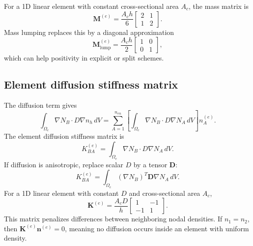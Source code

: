 \documentclass[11pt]{article}
\begin{document}
For a 1D linear element with constant cross-sectional area $A_c$, the mass matrix is
\begin{equation}
\bm{M}^{(e)}=\frac{A_c h}{6}
\begin{bmatrix}
2&1\\
1&2
\end{bmatrix}.
\label{eq:fem_1d_mass}
\end{equation}
Mass lumping replaces this by a diagonal approximation
\begin{equation}
\bm{M}^{(e)}_{\mathrm{lump}}=\frac{A_c h}{2}
\begin{bmatrix}
1&0\\
0&1
\end{bmatrix},
\end{equation}
which can help positivity in explicit or split schemes.

\subsection{Element diffusion stiffness matrix}
The diffusion term gives
\begin{equation}
\int_{\Omega_e}\nabla N_B\cdot D\nabla n_h\,dV
=\sum_{A=1}^{n_{en}}\left[\int_{\Omega_e}\nabla N_B\cdot D\nabla N_A\,dV\right]n_A^{(e)}.
\end{equation}
The element diffusion stiffness matrix is
\begin{equation}
K_{BA}^{(e)}=\int_{\Omega_e}\nabla N_B\cdot D\nabla N_A\,dV.
\label{eq:fem_qp_element_stiffness}
\end{equation}
If diffusion is anisotropic, replace scalar $D$ by a tensor $\bm{D}$:
\begin{equation}
K_{BA}^{(e)}=\int_{\Omega_e}(\nabla N_B)^T\bm{D}\nabla N_A\,dV.
\end{equation}
For a 1D linear element with constant $D$ and cross-sectional area $A_c$,
\begin{equation}
\bm{K}^{(e)}=\frac{A_cD}{h}
\begin{bmatrix}
1&-1\\
-1&1
\end{bmatrix}.
\label{eq:fem_1d_stiffness}
\end{equation}
This matrix penalizes differences between neighboring nodal densities. If $n_1=n_2$, then $\bm{K}^{(e)}\bm{n}^{(e)}=0$, meaning no diffusion occurs inside an element with uniform density.
\end{document}
